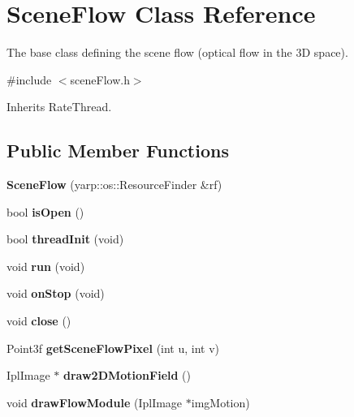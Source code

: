 \section{Scene\+Flow Class Reference}
\label{classSceneFlow}


The base class defining the scene flow (optical flow in the 3D space).  




{\ttfamily \#include $<$scene\+Flow.\+h$>$}



Inherits Rate\+Thread.

\subsection*{Public Member Functions}
\begin{DoxyCompactItemize}
\item 
{\bfseries Scene\+Flow} (yarp\+::os\+::\+Resource\+Finder \&rf)\label{classSceneFlow_a09a89df061b9ec7a6964f7d82d8272eb}

\item 
bool {\bfseries is\+Open} ()\label{classSceneFlow_a360b8be98c1c11f3543b6c0744f4da82}

\item 
bool {\bfseries thread\+Init} (void)\label{classSceneFlow_a8603d1225367313e78d74d5453afc647}

\item 
void {\bfseries run} (void)\label{classSceneFlow_a88ebf1f92e8d45073ac603dac1073c38}

\item 
void {\bfseries on\+Stop} (void)\label{classSceneFlow_a87be5bb61cff579f919a496748d33b0b}

\item 
void {\bfseries close} ()\label{classSceneFlow_a3c734406548b2f720c22302ded2233cd}

\item 
Point3f {\bfseries get\+Scene\+Flow\+Pixel} (int u, int v)\label{classSceneFlow_abff8df2a30a081071c27c86c680d9c91}

\item 
Ipl\+Image $\ast$ {\bfseries draw2\+D\+Motion\+Field} ()\label{classSceneFlow_a9a4241e4f2feb15510e8d83a6f8918e8}

\item 
void {\bfseries draw\+Flow\+Module} (Ipl\+Image $\ast$img\+Motion)\label{classSceneFlow_a546f4515e88a56dea1c9fc02d585d550}


\end{DoxyCompactItemize}
